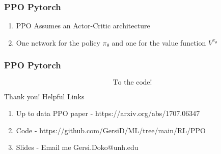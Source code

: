 \documentclass{beamer}
\begin{document}
\begin{frame}
  \frametitle{PPO Pytorch}
  \begin{enumerate}
    \item PPO Assumes an Actor-Critic architecture
      \vfill
    \item One network for the policy $\pi_\theta$ and one for the
      value function $V^{\pi_\theta}$
  \end{enumerate}
\end{frame}

\begin{frame}
  \frametitle{PPO Pytorch}
  \begin{centering}
    \[
      \text{To the code!}
    \]
  \end{centering}
\end{frame}

\begin{frame}{Thank you!}
  Helpful Links
  \vfill
  \begin{enumerate}
    \item Up to data PPO paper - https://arxiv.org/abs/1707.06347
    \item Code - https://github.com/GersiD/ML/tree/main/RL/PPO
    \item Slides - Email me Gersi.Doko@unh.edu
  \end{enumerate}
\end{frame}
\end{document}
